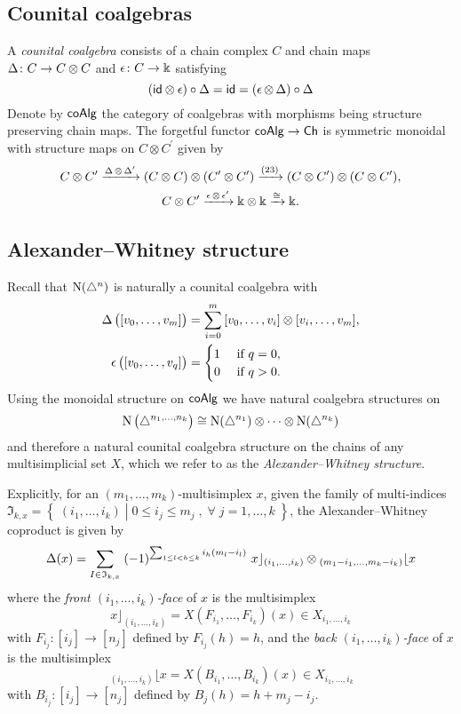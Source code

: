 \subsection{Counital coalgebras} \label{ss:coalgebras}

A \textit{counital coalgebra} consists of a chain complex $C$ and chain maps $\operatorname{\Delta} \colon C \to C \otimes C$ and $\operatorname{\epsilon} \colon C \to \Bbbk$ satisfying
\[
(\mathsf{id} \otimes \operatorname{\epsilon}) \circ \operatorname{\Delta} =
\mathsf{id} =
(\operatorname{\epsilon} \otimes \operatorname{\Delta}) \circ \operatorname{\Delta}
\]
Denote by $\mathsf{coAlg}$ the category of coalgebras with morphisms being structure preserving chain maps.
The forgetful functor $\mathsf{coAlg} \to \mathsf{Ch}$ is symmetric monoidal with structure maps on $C \otimes C^\prime$ given by
\begin{gather*}
C \otimes C^\prime \xrightarrow{\operatorname{\Delta} \otimes \operatorname{\Delta}^\prime}
(C \otimes C) \otimes (C^\prime \otimes C^\prime) \xrightarrow{(23)}
(C \otimes C^\prime) \otimes (C \otimes C^\prime), \\
C \otimes C^\prime \xrightarrow{\operatorname{\epsilon} \otimes \operatorname{\epsilon}^\prime}
\Bbbk \otimes \Bbbk \xrightarrow{\cong} \Bbbk.
\end{gather*}

\subsection{Alexander--Whitney structure} \label{ss:alexander-whitney coalgebras}

Recall that $\operatorname{N}(\triangle^n)$ is naturally a counital coalgebra with
\[
\begin{split}
\operatorname{\Delta} \big( [v_0, \dots, v_m] \big) &=
\sum_{i=0}^m \, [v_0, \dots, v_i] \otimes [v_i, \dots, v_m], \\
\operatorname{\epsilon} \big( [v_0, \dots, v_q] \big) &=
\begin{cases} 1 & \text{ if } q = 0, \\ 0 & \text{ if } q>0. \end{cases}
\end{split}
\]
Using the monoidal structure on $\mathsf{coAlg}$ we have natural coalgebra structures on
\[
\operatorname{N} \big( \triangle^{n_1, \dots, n_k} \big) \cong
\operatorname{N}(\triangle^{n_1}) \otimes \dotsb \otimes \operatorname{N}(\triangle^{n_k})
\]
and therefore a natural counital coalgebra structure on the chains of any multisimplicial set $X$, which we refer to as the \textit{Alexander--Whitney structure}.

Explicitly, for an $(m_1, \dots, m_k)$-multisimplex $x$, given the family of multi-indices $\mathfrak{I}_{k,x}=\left\lbrace \; (i_{1},\dots,i_{k}) \; \left| \; 0\le i_{j} \le m_{j} \; , \;  \forall \; j=1,\dots,k \; \right.  \right\rbrace $,  the Alexander--Whitney coproduct is given by
\[
\operatorname{\Delta}(x) =
\sum_{I\in \mathfrak{I}_{k,x}} \;
(-1)^{\sum_{1 \leq l<h \leq k} i_h (m_l-i_l) } \
x \rfloor_{(i_{1},\dots,i_{k})} \otimes
\!\,_{(m_{1}-i_{1}, \dots, m_{k}-i_{k})} \lfloor x
\]
where the \textit{front $(i_1, \dots, i_k)$-face} of $x$ is the multisimplex
\[
x \rfloor_{(i_{1}, \dots, i_{k})} =
X(F_{i_1}, \dots, F_{i_k})(x) \in X_{i_1, \dots, i_k}
\]
with
$F_{i_j} \colon [i_j] \to [n_j]$ defined by $F_{i_j}(h)=h$, and the \textit{back $(i_1, \dots, i_k)$-face} of $x$ is the multisimplex
\[
\,_{(i_{1}, \dots, i_{k})} \lfloor x =
X(B_{i_1}, \dots, B_{i_k})(x) \in X_{i_1, \dots, i_k}
\]
with $B_{i_j} \colon [i_j] \to [n_j]$ defined by $B_j(h) = h+m_j-i_j$.

